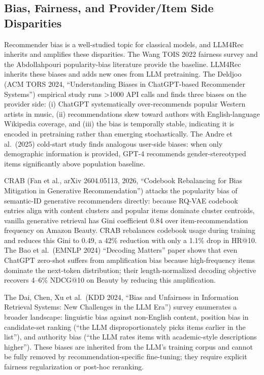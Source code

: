 \documentclass{article}
\begin{document}
\subsection{Bias, Fairness, and Provider/Item Side Disparities}\label{bias-fairness-and-provideritem-side-disparities}

Recommender bias is a well-studied topic for classical models, and LLM4Rec inherits and amplifies these disparities. The Wang TOIS 2022 fairness survey and the Abdollahpouri popularity-bias literature provide the baseline. LLM4Rec inherits these biases and adds new ones from LLM pretraining. The Deldjoo (ACM TORS 2024, ``Understanding Biases in ChatGPT-based Recommender Systems'') empirical study runs \textgreater1000 API calls and finds three biases on the provider side: (i) ChatGPT systematically over-recommends popular Western artists in music, (ii) recommendations skew toward authors with English-language Wikipedia coverage, and (iii) the bias is temporally stable, indicating it is encoded in pretraining rather than emerging stochastically. The Andre et al.~(2025) cold-start study finds analogous user-side biases: when only demographic information is provided, GPT-4 recommends gender-stereotyped items significantly above population baseline.

CRAB (Fan et al., arXiv 2604.05113, 2026, ``Codebook Rebalancing for Bias Mitigation in Generative Recommendation'') attacks the popularity bias of semantic-ID generative recommenders directly: because RQ-VAE codebook entries align with content clusters and popular items dominate cluster centroids, vanilla generative retrieval has Gini coefficient 0.84 over item-recommendation frequency on Amazon Beauty. CRAB rebalances codebook usage during training and reduces this Gini to 0.49, a 42\% reduction with only a 1.1\% drop in HR@10. The Bao et al.~(EMNLP 2024) ``Decoding Matters'' paper shows that even ChatGPT zero-shot suffers from amplification bias because high-frequency items dominate the next-token distribution; their length-normalized decoding objective recovers 4--6\% NDCG@10 on Beauty by reducing this amplification.

The Dai, Chen, Xu et al.~(KDD 2024, ``Bias and Unfairness in Information Retrieval Systems: New Challenges in the LLM Era'') survey enumerates a broader landscape: linguistic bias against non-English content, position bias in candidate-set ranking (``the LLM disproportionately picks items earlier in the list''), and authority bias (``the LLM rates items with academic-style descriptions higher''). These biases are inherited from the LLM's training corpus and cannot be fully removed by recommendation-specific fine-tuning; they require explicit fairness regularization or post-hoc reranking.
\end{document}
